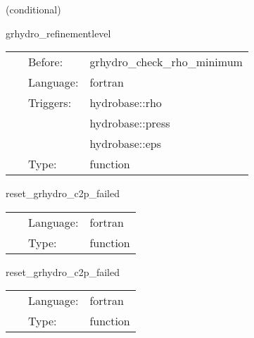 \documentclass{article}
\begin{document}
\vspace{5mm}

   (conditional) 

\hspace{5mm} grhydro\_refinementlevel 

\hspace{5mm}{\it calculate current refinement level } 


\hspace{5mm}

 \begin{tabular*}{160mm}{cll} 
~ & Before:  & grhydro\_check\_rho\_minimum \\ 
~ & Language:  & fortran \\ 
~ & Triggers:  & hydrobase::rho \\ 
~& ~ &hydrobase::press\\ 
~& ~ &hydrobase::eps\\ 
~ & Type:  & function \\ 
\end{tabular*} 


\vspace{5mm}


\hspace{5mm} reset\_grhydro\_c2p\_failed 

\hspace{5mm}{\it initialise the mask function that contains the points where c2p has failed (at basegrid) } 


\hspace{5mm}

 \begin{tabular*}{160mm}{cll} 
~ & Language:  & fortran \\ 
~ & Type:  & function \\ 
\end{tabular*} 


\vspace{5mm}


\hspace{5mm} reset\_grhydro\_c2p\_failed 

\hspace{5mm}{\it reset the mask function that contains the points where c2p has failed (at prestep) } 


\hspace{5mm}

 \begin{tabular*}{160mm}{cll} 
~ & Language:  & fortran \\ 
~ & Type:  & function \\ 
\end{tabular*} 
\end{document}
